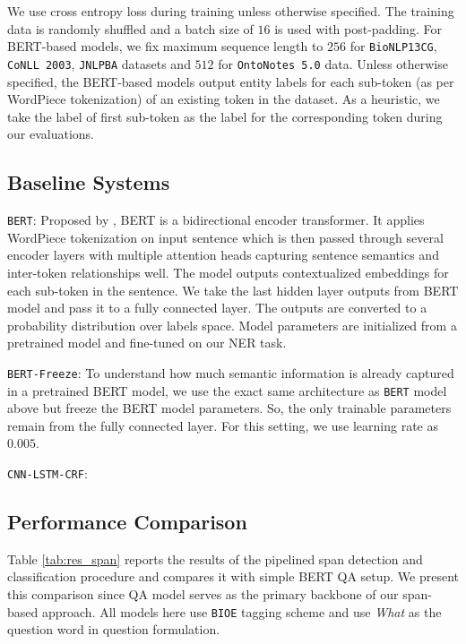 We use cross entropy loss during training unless otherwise specified. The training data is randomly shuffled and a batch size of $16$ is used with post-padding. For BERT-based models, we fix maximum sequence length to $256$ for \texttt{BioNLP13CG}, \texttt{CoNLL 2003}, \texttt{JNLPBA} datasets and $512$ for \texttt{OntoNotes 5.0} data. Unless otherwise specified, the BERT-based models output entity labels for each sub-token (as per WordPiece tokenization) of an existing token in the dataset. As a heuristic, we take the label of first sub-token as the label for the corresponding token during our evaluations.

\subsection{Baseline Systems}


\texttt{BERT}: Proposed by \cite{devlin2018bert}, BERT is a bidirectional encoder transformer\cite{vaswani2017attention}. It applies WordPiece\cite{wu2016google} tokenization on input sentence which is then passed through several encoder layers with multiple attention heads capturing sentence semantics and inter-token relationships well. The model outputs contextualized embeddings for each sub-token in the sentence. We take the last hidden layer outputs from BERT model and pass it to a fully connected layer. The outputs are converted to a probability distribution over labels space. Model parameters are initialized from a pretrained model and fine-tuned on our NER task.


\texttt{BERT-Freeze}: To understand how much semantic information is already captured in a pretrained BERT model, we use the exact same architecture as \texttt{BERT} model above but freeze the BERT model parameters. So, the only trainable parameters remain from the fully connected layer. For this setting, we use learning rate as $0.005$.

\texttt{CNN-LSTM-CRF}: 


\subsection{Performance Comparison}
Table \ref{tab:res_span} reports the results of the pipelined span detection and classification procedure and compares it with simple BERT QA setup. We present this comparison since QA model serves as the primary backbone of our span-based approach. All models here use \texttt{BIOE} tagging scheme and use \textit{What} as the question word in question formulation.

